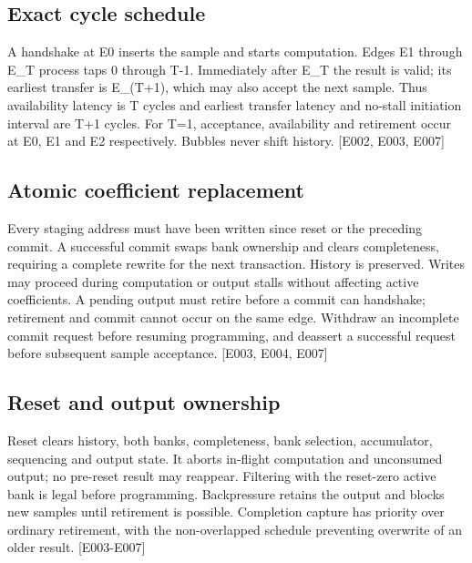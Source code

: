 \documentclass[11pt,a4paper]{article}
\begin{document}
\subsection{Exact cycle schedule}

A handshake at E0 inserts the sample and starts computation. Edges E1 through E\_\allowbreak{}T process taps 0 through T-1. Immediately after E\_\allowbreak{}T the result is valid; its earliest transfer is E\_\allowbreak{}(\allowbreak{}T+\allowbreak{}1)\allowbreak{},\allowbreak{} which may also accept the next sample. Thus availability latency is T cycles and earliest transfer latency and no-stall initiation interval are T+\allowbreak{}1 cycles. For T=\allowbreak{}1,\allowbreak{} acceptance,\allowbreak{} availability and retirement occur at E0,\allowbreak{} E1 and E2 respectively. Bubbles never shift history. [\allowbreak{}E002,\allowbreak{} E003,\allowbreak{} E007]\allowbreak{}

\subsection{Atomic coefficient replacement}

Every staging address must have been written since reset or the preceding commit. A successful commit swaps bank ownership and clears completeness,\allowbreak{} requiring a complete rewrite for the next transaction. History is preserved. Writes may proceed during computation or output stalls without affecting active coefficients. A pending output must retire before a commit can handshake; retirement and commit cannot occur on the same edge. Withdraw an incomplete commit request before resuming programming,\allowbreak{} and deassert a successful request before subsequent sample acceptance. [\allowbreak{}E003,\allowbreak{} E004,\allowbreak{} E007]\allowbreak{}

\subsection{Reset and output ownership}

Reset clears history,\allowbreak{} both banks,\allowbreak{} completeness,\allowbreak{} bank selection,\allowbreak{} accumulator,\allowbreak{} sequencing and output state. It aborts in-flight computation and unconsumed output; no pre-reset result may reappear. Filtering with the reset-zero active bank is legal before programming. Backpressure retains the output and blocks new samples until retirement is possible. Completion capture has priority over ordinary retirement,\allowbreak{} with the non-overlapped schedule preventing overwrite of an older result. [\allowbreak{}E003-E007]\allowbreak{}
\end{document}
